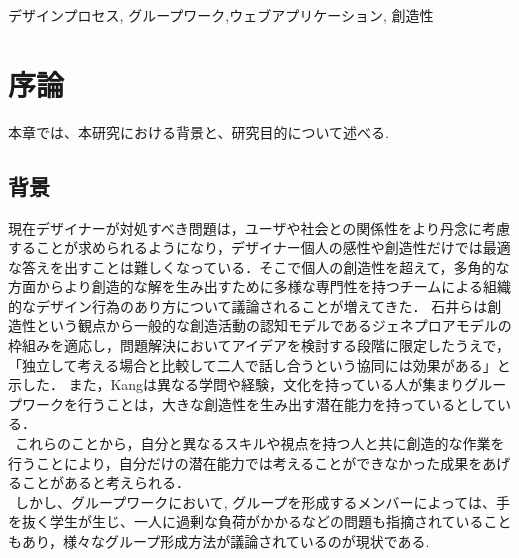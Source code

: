 \documentclass{funthesis}
\begin{document}
\begin{jkeyword}
デザインプロセス, グループワーク,ウェブアプリケーション, 創造性
\end{jkeyword}

\tableofcontents %


\chapter{序論} %

本章では、本研究における背景と、研究目的について述べる.


\section{背景} %


現在デザイナーが対処すべき問題は，ユーザや社会との関係性をより丹念に考慮することが求められるようになり，デザイナー個人の感性や創造性だけでは最適な答えを出すことは難しくなっている．そこで個人の創造性を超えて，多角的な方面からより創造的な解を生み出すために多様な専門性を持つチームによる組織的なデザイン行為のあり方について議論されることが増えてきた\cite{A1}． 石井らは創造性という観点から一般的な創造活動の認知モデルであるジェネプロアモデルの枠組みを適応し，問題解決においてアイデアを検討する段階に限定したうえで，「独立して考える場合と比較して二人で話し合うという協同には効果がある」と示した\cite{A2}． また，Kangは異なる学問や経験，文化を持っている人が集まりグループワークを行うことは，大きな創造性を生み出す潜在能力を持っている\cite{A3}としている．\\
\ これらのことから，自分と異なるスキルや視点を持つ人と共に創造的な作業を行うことにより，自分だけの潜在能力では考えることができなかった成果をあげることがあると考えられる．\\
\ しかし、グループワークにおいて, グループを形成するメンバーによっては、手を抜く学生が生じ、一人に過剰な負荷がかかるなどの問題も指摘されている\cite{A4}こともあり，様々なグループ形成方法が議論されているのが現状である.
\end{document}
